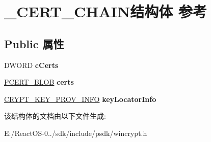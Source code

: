 \hypertarget{struct___c_e_r_t___c_h_a_i_n}{}\section{\+\_\+\+C\+E\+R\+T\+\_\+\+C\+H\+A\+I\+N结构体 参考}
\label{struct___c_e_r_t___c_h_a_i_n}
\subsection*{Public 属性}
\begin{DoxyCompactItemize}
\item 
\mbox{\label{struct___c_e_r_t___c_h_a_i_n_a826cbe084aec8a77aea28d687047dcbc}} 
D\+W\+O\+RD {\bfseries c\+Certs}
\item 
\mbox{\label{struct___c_e_r_t___c_h_a_i_n_ab026d8957a1d7003d4007bae6b9ba0ba}} 
\hyperlink{struct___c_r_y_p_t_o_a_p_i___b_l_o_b}{P\+C\+E\+R\+T\+\_\+\+B\+L\+OB} {\bfseries certs}
\item 
\mbox{\label{struct___c_e_r_t___c_h_a_i_n_a2e40105fdad839c92995d420d35fe700}} 
\hyperlink{struct___c_r_y_p_t___k_e_y___p_r_o_v___i_n_f_o}{C\+R\+Y\+P\+T\+\_\+\+K\+E\+Y\+\_\+\+P\+R\+O\+V\+\_\+\+I\+N\+FO} {\bfseries key\+Locator\+Info}
\end{DoxyCompactItemize}


该结构体的文档由以下文件生成\+:\begin{DoxyCompactItemize}
\item 
E\+:/\+React\+O\+S-\/0../sdk/include/psdk/wincrypt.\+h\end{DoxyCompactItemize}

